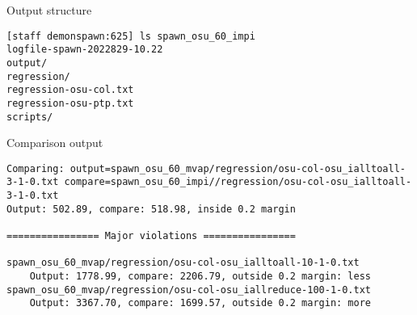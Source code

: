 \begin{numberedframe}{Output structure}
\begin{verbatim}
[staff demonspawn:625] ls spawn_osu_60_impi
logfile-spawn-2022829-10.22
output/
regression/
regression-osu-col.txt
regression-osu-ptp.txt
scripts/
\end{verbatim}
\end{numberedframe}

\begin{numberedframe}{Comparison output}
\tiny
\begin{verbatim}
Comparing: output=spawn_osu_60_mvap/regression/osu-col-osu_ialltoall-3-1-0.txt compare=spawn_osu_60_impi//regression/osu-col-osu_ialltoall-3-1-0.txt
Output: 502.89, compare: 518.98, inside 0.2 margin

================ Major violations ================

spawn_osu_60_mvap/regression/osu-col-osu_ialltoall-10-1-0.txt 
    Output: 1778.99, compare: 2206.79, outside 0.2 margin: less
spawn_osu_60_mvap/regression/osu-col-osu_iallreduce-100-1-0.txt
    Output: 3367.70, compare: 1699.57, outside 0.2 margin: more
\end{verbatim}
\end{numberedframe}

